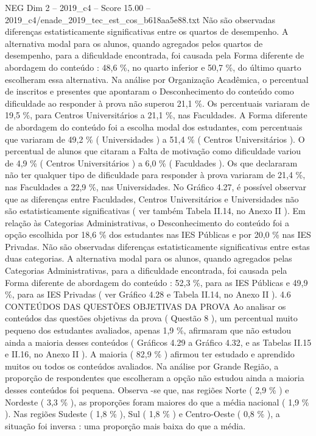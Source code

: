 \begin{textsample}{NEG Dim 2 – 2019\_c4 – Score 15.00 – 2019\_c4/enade\_2019\_tec\_est\_cos\_b618aa5e88.txt}
Não são observadas diferenças estatisticamente significativas entre os quartos de desempenho.
A alternativa modal para os alunos, quando agregados pelos quartos de desempenho, para a dificuldade encontrada, foi causada pela Forma diferente de abordagem do conteúdo : 48,6 \%, no quarto inferior e 50,7 \%, do último quarto escolheram essa alternativa.
Na análise por Organização Acadêmica, o percentual de inscritos e presentes que apontaram o Desconhecimento do conteúdo como dificuldade ao responder à prova não superou 21,1 \%.
Os percentuais variaram de 19,5 \%, para Centros Universitários a 21,1 \%, nas Faculdades.
A Forma diferente de abordagem do conteúdo foi a escolha modal dos estudantes, com percentuais que variaram de 49,2 \% ( Universidades ) a 51,4 \% ( Centros Universitários ).
O percentual de alunos que citaram a Falta de motivação como dificuldade variou de 4,9 \% ( Centros Universitários ) a 6,0 \% ( Faculdades ).
Os que declararam não ter qualquer tipo de dificuldade para responder à prova variaram de 21,4 \%, nas Faculdades a 22,9 \%, nas Universidades.
No Gráfico 4.27, é possível observar que as diferenças entre Faculdades, Centros Universitários e Universidades não são estatisticamente significativas ( ver também Tabela II.14, no Anexo II ).
Em relação às Categorias Administrativas, o Desconhecimento do conteúdo foi a opção escolhida por 18,6 \% dos estudantes nas IES Públicas e por 20,0 \% nas IES Privadas.
Não são observadas diferenças estatisticamente significativas entre estas duas categorias.
A alternativa modal para os alunos, quando agregados pelas Categorias Administrativas, para a dificuldade encontrada, foi causada pela Forma diferente de abordagem do conteúdo : 52,3 \%, para as IES Públicas e 49,9 \%, para as IES Privadas ( ver Gráfico 4.28 e Tabela II.14, no Anexo II ). 4.6 CONTEÚDOS DAS QUESTÕES OBJETIVAS DA PROVA Ao analisar os conteúdos das questões objetivas da prova ( Questão 8 ), um percentual muito pequeno dos estudantes avaliados, apenas 1,9 \%, afirmaram que não estudou ainda a maioria desses conteúdos ( Gráficos 4.29 a Gráfico 4.32, e as Tabelas II.15 e II.16, no Anexo II ).
A maioria ( 82,9 \% ) afirmou ter estudado e aprendido muitos ou todos os conteúdos avaliados.
Na análise por Grande Região, a proporção de respondentes que escolheram a opção não estudou ainda a maioria desses conteúdos foi pequena.
Observa -se que, nas regiões Norte ( 2,9 \% ) e Nordeste ( 3,3 \% ), as proporções foram maiores do que a média nacional ( 1,9 \% ).
Nas regiões Sudeste ( 1,8 \% ), Sul ( 1,8 \% ) e Centro-Oeste ( 0,8 \% ), a situação foi inversa : uma proporção mais baixa do que a média.

\end{textsample}

